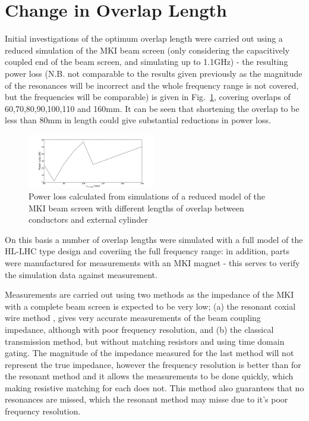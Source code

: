 \documentclass[a4paper,
              ]{jacow}
\begin{document}
\section{Change in Overlap Length}

Initial investigations of the optimum overlap length were carried out using a reduced simulation of the MKI beam screen (only considering the capacitively coupled end of the beam screen, and simulating up to 1.1GHz) - the resulting power loss (N.B. not comparable to the results given previously as the magnitude of the resonances will be incorrect and the whole frequency range is not covered, but the frequencies will be comparable) is given in Fig.~\ref{fig:powLossLowRes}, covering overlaps of 60,70,80,90,100,110 and 160mm. It can be seen that shortening the overlap to be less than 80mm in length could give substantial reductions in power loss.

\begin{figure}
\begin{center}
\includegraphics[width=0.5\textwidth]{powLossLowRes.pdf}
\caption{Power loss calculated from simulations of a reduced model of the MKI beam screen with different lengths of overlap between conductors and external cylinder}
\label{fig:powLossLowRes}
\end{center}
\end{figure}

On this basis a number of overlap lengths were simulated with a full model of the HL-LHC type design and coveriing the full frequency range: in addition, parts were manufactured for measurements with an MKI magnet - this serves to verify the simulation data against measurement. 

Measurements are carried out using two methods as the impedance of the MKI with a complete beam screen is expected to be very low; (a) the resonant coxial wire method \cite{DayThesis}, gives very accurate measurements of the beam coupling impedance, although with poor frequency resolution, and (b) the classical transmission method, but without matching resistors and using time domain gating. The magnitude of the impedance measured for the last method will not represent the true impedance, however the frequency resolution is better than for the resonant method and it allows the measurements to be done quickly, which making resistive matching for each does not. This  method also guarantees that no resonances are missed, which the resonant method may misse due to it's poor frequency resolution.
\end{document}
